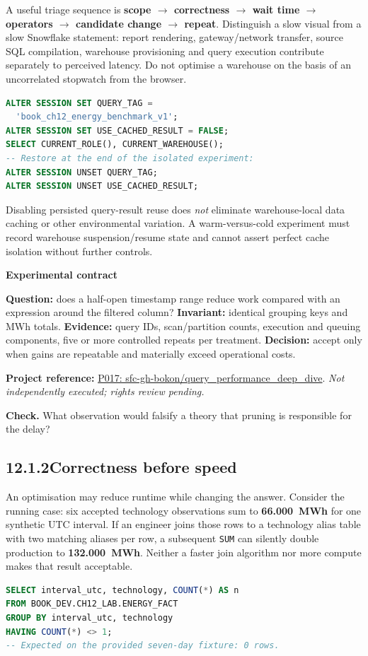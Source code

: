 \documentclass[11pt,twoside]{article}
\newcommand{\topic}[2]{\subsection*{#1\quad #2}}
\newcommand{\repo}[2]{\par\begingroup\fontsize{8.0}{9.6}\selectfont\sffamily\color{inkgray}\textbf{Project reference:} \href{#2}{#1}. \textit{Not independently executed; rights review pending.}\par\endgroup}
\begin{document}
A useful triage sequence is \textbf{scope $\to$ correctness $\to$ wait time $\to$ operators $\to$ candidate change $\to$ repeat}. Distinguish a slow visual from a slow Snowflake statement: report rendering, gateway/network transfer, source SQL compilation, warehouse provisioning and query execution contribute separately to perceived latency. Do not optimise a warehouse on the basis of an uncorrelated stopwatch from the browser.
\begin{lstlisting}[language=SQL,caption={Illustrative session controls: do not change shared warehouses.}]
ALTER SESSION SET QUERY_TAG =
  'book_ch12_energy_benchmark_v1';
ALTER SESSION SET USE_CACHED_RESULT = FALSE;
SELECT CURRENT_ROLE(), CURRENT_WAREHOUSE();
-- Restore at the end of the isolated experiment:
ALTER SESSION UNSET QUERY_TAG;
ALTER SESSION UNSET USE_CACHED_RESULT;
\end{lstlisting}
Disabling persisted query-result reuse does \emph{not} eliminate warehouse-local data caching or other environmental variation. A warm-versus-cold experiment must record warehouse suspension/resume state and cannot assert perfect cache isolation without further controls.
\begin{whitebox}\textbf{Experimental contract}\par
\textbf{Question:} does a half-open timestamp range reduce work compared with an expression around the filtered column? \textbf{Invariant:} identical grouping keys and MWh totals. \textbf{Evidence:} query IDs, scan/partition counts, execution and queuing components, five or more controlled repeats per treatment. \textbf{Decision:} accept only when gains are repeatable and materially exceed operational costs.\end{whitebox}
\repo{P017: sfc-gh-bokon/query\_performance\_deep\_dive}{https://github.com/sfc-gh-bokon/query_performance_deep_dive}
\textbf{Check.} What observation would falsify a theory that pruning is responsible for the delay?
\newpage
\topic{12.1.2}{Correctness before speed}
An optimisation may reduce runtime while changing the answer. Consider the running case: six accepted technology observations sum to \textbf{66.000~MWh} for one synthetic UTC interval. If an engineer joins those rows to a technology alias table with two matching aliases per row, a subsequent \texttt{SUM} can silently double production to \textbf{132.000~MWh}. Neither a faster join algorithm nor more compute makes that result acceptable.
\begin{lstlisting}[language=SQL,caption={Confirm the gold grain before joining.}]
SELECT interval_utc, technology, COUNT(*) AS n
FROM BOOK_DEV.CH12_LAB.ENERGY_FACT
GROUP BY interval_utc, technology
HAVING COUNT(*) <> 1;
-- Expected on the provided seven-day fixture: 0 rows.
\end{lstlisting}
\end{document}
